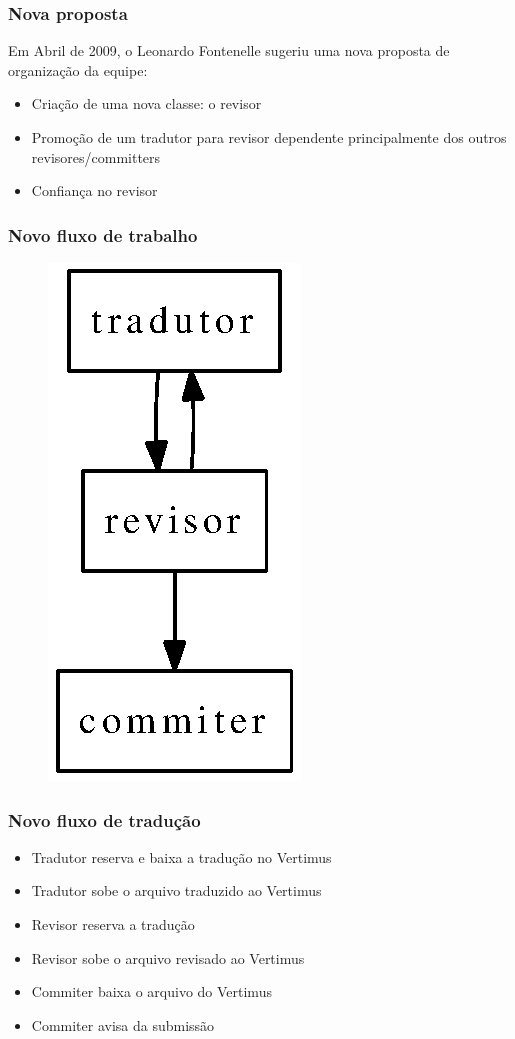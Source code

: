 \documentclass{beamer}
\begin{document}
\begin{frame}
    \frametitle{Nova proposta}  
    Em Abril de 2009, o Leonardo Fontenelle sugeriu uma nova proposta de organização da equipe:
    \begin{itemize}[<+->]
        \item Criação de uma nova classe: o revisor
        \item Promoção de um tradutor para revisor dependente principalmente dos outros revisores/committers
        \item Confiança no revisor
    \end{itemize}
\end{frame}

\begin{frame}
    \frametitle{Novo fluxo de trabalho}
    \begin{figure}[ht]
        \includegraphics{fluxo_novo.eps}     
    \end{figure}
\end{frame}

\begin{frame}
    \frametitle[Vertimus]{Novo fluxo de tradução}
    \begin{itemize}[<+->]
        \item Tradutor reserva e baixa a tradução no Vertimus
        \item Tradutor sobe o arquivo traduzido ao Vertimus
        \item Revisor reserva a tradução
        \item Revisor sobe o arquivo revisado ao Vertimus
        \item Commiter baixa o arquivo do Vertimus
        \item Commiter avisa da submissão
    \end{itemize}
\end{frame}
\end{document}
